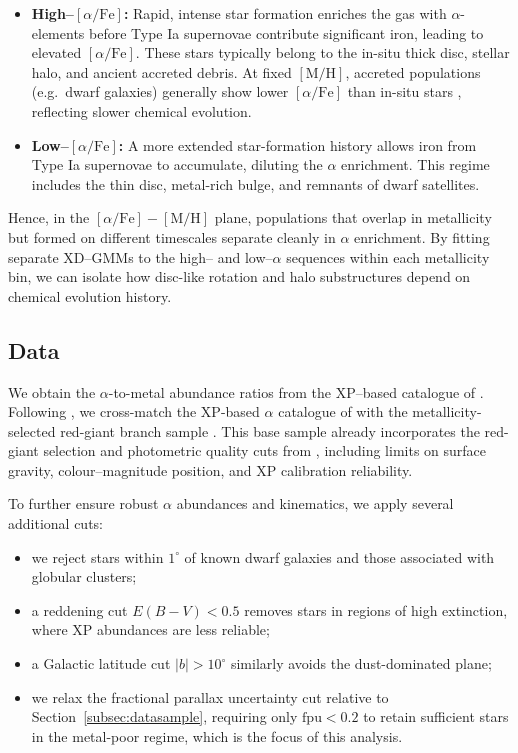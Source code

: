 \documentclass[a4paper,12pt]{article}
\begin{document}
\begin{itemize}
  \item \textbf{High–$[\alpha/\mathrm{Fe}]$:}  
    Rapid, intense star formation enriches the gas with $\alpha$-elements before Type Ia supernovae 
    contribute significant iron, leading to elevated $[\alpha/\mathrm{Fe}]$. These stars typically belong 
    to the in-situ thick disc, stellar halo, and ancient accreted debris. At fixed $[\mathrm{M/H}]$, 
    accreted populations (e.g.\ dwarf galaxies) generally show lower $[\alpha/\mathrm{Fe}]$ than in-situ 
    stars \citep{Helmi2018}, reflecting slower chemical evolution.
    
  \item \textbf{Low–$[\alpha/\mathrm{Fe}]$:}  
    A more extended star-formation history allows iron from Type Ia supernovae to accumulate, diluting 
    the $\alpha$ enrichment. This regime includes the thin disc, metal-rich bulge, and remnants of dwarf 
    satellites.
\end{itemize}

Hence, in the $[\alpha/\mathrm{Fe}]\!-\![\mathrm{M/H}]$ plane, populations that overlap in metallicity but 
formed on different timescales separate cleanly in $\alpha$ enrichment. By fitting separate XD–GMMs to the 
high– and low–$\alpha$ sequences within each metallicity bin, we can isolate how disc-like rotation and 
halo substructures depend on chemical evolution history.




\subsection{Data}
\label{subsec:data_vis}


We obtain the $\alpha$-to-metal abundance ratios from the
XP–based catalogue of \citet{Li2024}.
Following \citet{Vis2024}, we cross-match the XP-based $\alpha$ catalogue 
of \citet{Li2024} with the metallicity-selected red-giant branch sample . This base sample already 
incorporates the red-giant selection and photometric quality cuts from 
\citet{Andrae2023}, including limits on surface gravity, colour–magnitude 
position, and XP calibration reliability. 

To further ensure robust $\alpha$ abundances and kinematics, we apply 
several additional cuts:
\begin{itemize}\setlength\itemsep{2pt}
  \item we reject stars within $1^\circ$ of known dwarf galaxies and 
        those associated with globular clusters;
  \item a reddening cut $E(B-V)<0.5$ removes stars in regions of high 
        extinction, where XP abundances are less reliable;
  \item a Galactic latitude cut $|b|>10^\circ$ similarly avoids 
        the dust-dominated plane;
  \item we relax the fractional parallax uncertainty cut relative to 
        Section~\ref{subsec:datasample}, requiring only $\mathrm{fpu}<0.2$
        to retain sufficient stars in the metal-poor regime, which is 
        the focus of this analysis.
\end{itemize}
\end{document}
